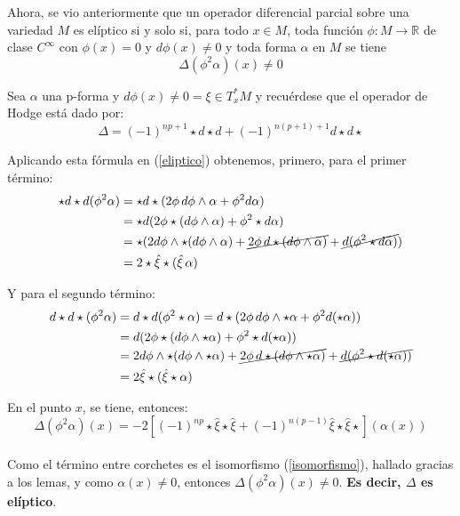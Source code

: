 Ahora, se vio anteriormente que un operador diferencial parcial sobre una variedad $M$ es elíptico si y solo si, para todo $x \in M$, toda función $\phi\colon M \to \mathbb{R}$ de clase $C^\infty$ con $\phi(x) = 0$ y $d\phi(x) \neq 0$ y toda forma $\alpha$ en $M$ se tiene
\begin{equation}
\label{eliptico}
    \Delta(\phi^2\alpha)(x) \neq 0
\end{equation}

Sea $\alpha$ una p-forma y $d\phi(x) \neq 0 = \xi \in T^*_xM$ y recuérdese que el operador de Hodge está dado por:
\[\Delta  = (-1)^{np+1}\star d \star d + (-1)^{n(p+1)+1}d\star d\star \]

Aplicando esta fórmula en (\ref{eliptico}) obtenemos, primero, para el primer término:
\begin{align*}
\star d\star d(\phi^2 \alpha) &= \star d\star (2\phi\, d\phi\wedge \alpha + \phi^2 d\alpha) \\ 
&= \star d (2\phi \star (d\phi\wedge \alpha) + \phi^2 \star d\alpha) \\
&= \star (2d\phi \wedge \star (d\phi\wedge \alpha) + \cancel{2\phi\, d \star (d\phi\wedge \alpha)} + \cancel{d(\phi^2 \star d\alpha)})\\
&= 2\star \hat\xi \star (\hat\xi\,\alpha)
\end{align*}

Y para el segundo término:
\begin{align*}
d\star d\star(\phi^2 \alpha) &= d\star d(\phi^2 \star\alpha)
= d\star (2\phi\, d\phi\wedge \star\alpha + \phi^2 d(\star\alpha)) \\
&= d (2\phi \star (d\phi\wedge \star\alpha) + \phi^2 \star d(\star\alpha)) \\
&= 2d\phi \wedge \star (d\phi\wedge \star\alpha) + \cancel{2\phi\, d \star (d\phi\wedge \star\alpha)} + \cancel{d(\phi^2 \star d(\star\alpha))}\\
&= 2\hat\xi \star (\hat\xi \star\alpha)
\end{align*}

En el punto $x$, se tiene, entonces:
\begin{equation}
    \Delta(\phi^2\alpha)(x) = -2[(-1)^{np}\star \hat\xi \star \hat\xi+(-1)^{n(p-1)}\hat\xi \star \hat\xi \star](\alpha(x))
\end{equation}
\\
Como el término entre corchetes es el isomorfismo (\ref{isomorfismo}), hallado gracias a los lemas, y como $\alpha(x) \neq 0$, entonces $\Delta(\phi^2\alpha)(x) \neq 0$. \textbf{Es decir, $\Delta$ es elíptico}.


